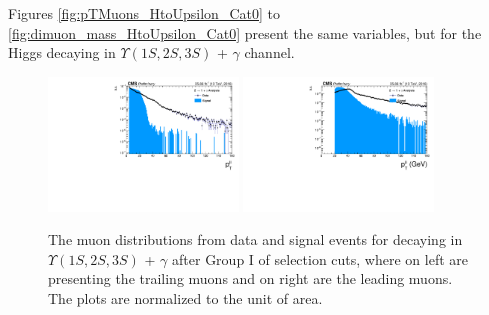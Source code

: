 Figures \ref{fig:pTMuons_HtoUpsilon_Cat0} to \ref{fig:dimuon_mass_HtoUpsilon_Cat0} present the same variables, but for the Higgs decaying in $\Upsilon(1S,2S,3S)$ + $\gamma$ channel.

\begin{figure}[!htbp]
\begin{center}
\includegraphics[width=0.45\textwidth]{figures/outputPlots/ZtoUpsilon_Cat0_ZZZZZ/au/data_x_mc/noKinCuts/h_noKin_TrailingMu_pt}\hspace*{1.cm}
\includegraphics[width=0.45\textwidth]{figures/outputPlots/ZtoUpsilon_Cat0_ZZZZZ/au/data_x_mc/noKinCuts/h_noKin_LeadingMu_pt}
\end{center}\vspace*{-.5cm}
\caption{The \PT muon distributions from data and signal events for \Z decaying in $\Upsilon(1S,2S,3S)$ + $\gamma$ after Group I of selection cuts, where on left are presenting the trailing muons and on right are the leading muons. The plots are normalized to the unit of area.}
\label{fig:pTMuons_ZtoUpsilon_Cat0}
\end{figure}


